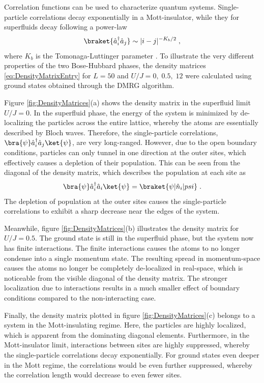 Correlation functions can be used to characterize quantum systems. Single-particle correlations decay exponentially in a Mott-insulator, while they for superfluids decay following a power-law 
\begin{equation}
	\braket{\hat{a}_{i}^{\dag} \hat{a}_{j}} \sim |i - j|^{-K_b /2} \; ,
	\label{eq:superfluidCorrelation}
\end{equation}
where $K_b$ is the Tomonaga-Luttinger parameter \cite{characPhases}. To illustrate the very different properties of the two Bose-Hubbard phases, the density matrices \eqref{eq:DensityMatrixEntry} for $L = 50$ and $U/J = 0, \; 0.5, \; 12$ were calculated using ground states obtained through the DMRG algorithm. 

Figure \ref{fig:DensityMatrices}(a) shows the density matrix in the superfluid limit $U/J = 0$. In the superfluid phase, the energy of the system is minimized by de-localizing the particles across the entire lattice, whereby the atoms are essentially described by Bloch waves. Therefore, the single-particle correlations, $\bra{\psi} \hat{a}_{i}^{\dag} \hat{a}_{j} \ket{\psi}$, are very long-ranged. However, due to the open boundary conditions, particles can only tunnel in one direction at the outer sites, which effectively causes a depletion of their population. This can be seen from the diagonal of the density matrix, which describes the population at each site as
\begin{equation}
	\bra{\psi} \hat{a}_{i}^{\dag} \hat{a}_{i} \ket{\psi} = \braket{\psi | \hat{n}_i | psi} \; .
\end{equation}
The depletion of population at the outer sites causes the single-particle correlations to exhibit a sharp decrease near the edges of the system.

Meanwhile, figure \ref{fig:DensityMatrices}(b) illustrates the density matrix for $U/J = 0.5$. The ground state is still in the superfluid phase, but the system now has finite interactions. The finite interactions causes the atoms to no longer condense into a single momentum state. The resulting spread in momentum-space causes the atoms no longer be completely de-localized in real-space, which is noticeable from the visible diagonal of the density matrix. The stronger localization due to interactions results in a much smaller effect of boundary conditions compared to the non-interacting case. 

Finally, the density matrix plotted in figure \ref{fig:DensityMatrices}(c) belongs to a system in the Mott-insulating regime. Here, the particles are highly localized, which is apparent from the dominating diagonal elements. Furthermore, in the Mott-insulator limit, interactions between sites are highly suppressed, whereby the single-particle correlations decay exponentially. For ground states even deeper in the Mott regime, the correlations would be even further suppressed, whereby the correlation length would decrease to even fewer sites. 

